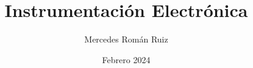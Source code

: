 \documentclass[12pt, a4paper, twoside]{book}
\title{Instrumentación Electrónica}
\author{Mercedes Román Ruiz}
\date{Febrero 2024}
\begin{document}
\sloppy 
\setlength{\parindent}{30pt}
\setlength{\parskip}{6pt}
\renewcommand\thesection{\arabic{section}}
\renewcommand{\baselinestretch}{1.5}
\renewcommand{\listtablename}{Índice de tablas} %
\renewcommand{\tablename}{Tabla} %
\renewcommand{\baselinestretch}{1.5}

\fancyhead{}
\fancyfoot{}
\pagestyle{fancy}
\chead[\rightmark]{\leftmark}

\fancyfoot[LE,RO]{\thepage}









\nocite{*}
\printbibliography
\end{document}
